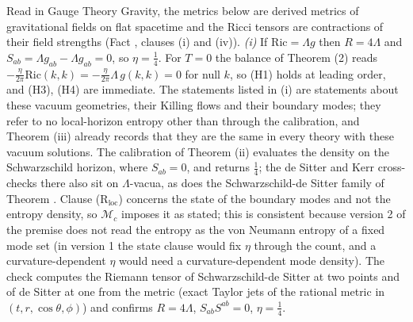 Read in Gauge Theory Gravity, the metrics below are derived metrics of gravitational fields on flat spacetime and the Ricci tensors are contractions of their field strengths (Fact , clauses (i) and (iv)). \emph{(i)} If $\mathrm{Ric} = \Lambda g$ then $R = 4\Lambda$ and $S_{ab} = \Lambda g_{ab} - \Lambda g_{ab} = 0$, so $\eta = \tfrac14$. For $T = 0$ the balance of Theorem (2) reads $-\tfrac{\eta}{2\pi}\mathrm{Ric}(k,k) = -\tfrac{\eta}{2\pi}\Lambda\,g(k,k) = 0$ for null $k$, so (H1) holds at leading order, and (H3), (H4) are immediate. The statements listed in (i) are statements about these vacuum geometries, their Killing flows and their boundary modes; they refer to no local-horizon entropy other than through the calibration, and Theorem (iii) already records that they are the same in every theory with these vacuum solutions. The calibration of Theorem (ii) evaluates the density on the Schwarzschild horizon, where $S_{ab} = 0$, and returns $\tfrac14$; the de Sitter and Kerr cross-checks there also sit on $\Lambda$-vacua, as does the Schwarzschild-de Sitter family of Theorem . Clause (R$_{\mathrm{loc}}$) concerns the state of the boundary modes and not the entropy density, so $\mathcal{M}_{c}$ imposes it as stated; this is consistent because version 2 of the premise does not read the entropy as the von Neumann entropy of a fixed mode set (in version 1 the state clause would fix $\eta$ through the count, and a curvature-dependent $\eta$ would need a curvature-dependent mode density). The check computes the Riemann tensor of Schwarzschild-de Sitter at two points and of de Sitter at one from the metric (exact Taylor jets of the rational metric in $(t, r, \cos\theta, \phi)$) and confirms $R = 4\Lambda$, $S_{ab}S^{ab} = 0$, $\eta = \tfrac14$.

